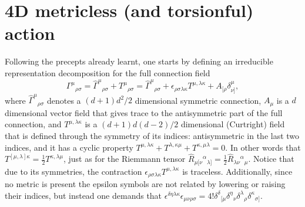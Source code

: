 \documentclass[twocolumn,
  showpacs,showkeys,prd,superscriptaddress]{revtex4-1}
\begin{document}

\section{4D metricless (and torsionful) action}

Following the precepts  already learnt, one starts  by defining an irreducible representation decomposition for the full connection field 
\begin{equation}
  \Gamma^\mu{}_{\rho\sigma} = \hat{\Gamma}^\mu{}_{\rho\sigma} + T^\mu{}_{\rho\sigma} = \hat{\Gamma}^\mu{}_{\rho\sigma} + \epsilon_{\rho\sigma\lambda\kappa}T^{\mu,\lambda\kappa}+A_{[\rho}\delta^\mu_{\nu]},
\end{equation}
where $\hat{\Gamma}^\mu{}_{\rho\sigma}$ denotes a $(d+1)d^2/2$ dimensional symmetric connection, $A_\mu$ is a $d$ dimensional vector field  that gives trace to the antisymmetric part of the full connection, and  $T^{\mu,\lambda\kappa}$ is a $(d+1)d(d-2)/2$ dimensional (Curtright) field that is defined through the symmetry of its indices: antisymmetric in the last two indices, and it has a cyclic property $T^{\mu,\lambda\kappa}+T^{\lambda,\kappa\mu}+T^{\kappa,\mu\lambda}=0$. In other words that $T^{[\mu,\lambda]\kappa}=\frac{1}{2}T^{\kappa,\lambda\mu}$, just as for  the Riemmann tensor $\hat{R}_{\mu[\nu}{}^\alpha{}_{\lambda]}=\frac{1}{2}\hat{R}_{\lambda\nu}{}^\alpha{}_{\mu}$. Notice that due to its symmetries, the contraction $\epsilon_{\rho\sigma\lambda\kappa}T^{\mu,\lambda\kappa}$ is traceless. Additionally, since no metric is present  the epsilon symbols are not related by lowering or raising their indices, but instead one demands that $\epsilon^{\delta\eta\lambda\kappa}\epsilon_{\mu\nu\rho\sigma}=4!\delta^{\delta}{}_{[\mu}\delta^\eta{}_{\nu}\delta^{\lambda}{}_{\rho} \delta^\kappa{}_{\sigma]}$.
\end{document}
